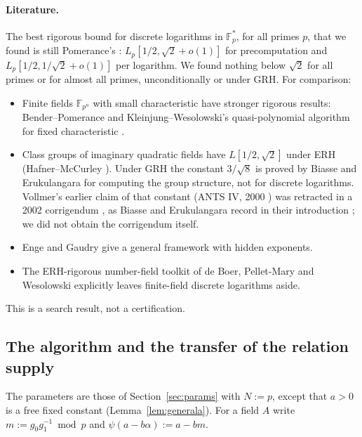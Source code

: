 \documentclass[11pt]{amsart}
\theoremstyle{definition}
\newcommand{\F}{\mathbb{F}}
\begin{document}
\paragraph{Literature.} The best rigorous bound for discrete logarithms in $\F_p^*$, for all primes $p$, that we found is still Pomerance's
\cite{pomerance1987}: $L_p[1/2,\sqrt2+o(1)]$ for precomputation and $L_p[1/2,1/\sqrt2+o(1)]$ per logarithm. We found nothing below
$\sqrt2$ for all primes or for almost all primes, unconditionally or under GRH. For comparison:
\begin{itemize}
\item Finite fields $\F_{p^n}$ with small characteristic have stronger rigorous results: Bender--Pomerance \cite{benderpomerance1998} and
  Kleinjung--Wesolowski's quasi-polynomial algorithm for fixed characteristic \cite{kw2022}.
\item Class groups of imaginary quadratic fields have $L[1/2,\sqrt2]$ under ERH (Hafner--McCurley \cite{hafnermccurley1989}). Under GRH the
  constant $3/\sqrt8$ is proved by Biasse and Erukulangara \cite{biasse2023} for computing the group structure, not for discrete logarithms.
  Vollmer's earlier claim of that constant (ANTS IV, 2000 \cite{vollmer2000}) was retracted in a 2002 corrigendum \cite{vollmer2002}, as
  Biasse and Erukulangara record in their introduction \cite{biasse2023}; we did not obtain the corrigendum itself.
\item Enge and Gaudry \cite{engegaudry2002} give a general framework with hidden exponents.
\item The ERH-rigorous number-field toolkit of de Boer, Pellet-Mary and Wesolowski \cite{dbpw2025} explicitly leaves finite-field discrete
  logarithms aside.
\end{itemize}
This is a search result, not a certification.

\subsection{The algorithm and the transfer of the relation supply}

The parameters are those of Section~\ref{sec:params} with $N:=p$, except that $a>0$ is a free fixed constant (Lemma~\ref{lem:generala}).
For a field $A$ write $m:=g_0g_1^{-1}\bmod p$ and $\psi(a-b\alpha):=a-bm$.
\end{document}
